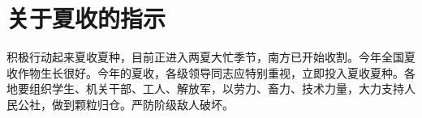 \section[关于夏收的指示（一九六七年六月三日）]{关于夏收的指示}


积极行动起来夏收夏种，目前正进入两夏大忙季节，南方已开始收割。今年全国夏收作物生长很好。今年的夏收，各级领导同志应特别重视，立即投入夏收夏种。各地要组织学生、机关干部、工人、解放军，以劳力、畜力、技术力量，大力支持人民公社，做到颗粒归仓。严防阶级敌人破坏。

